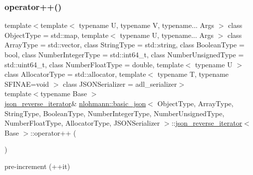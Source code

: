 \subsubsection{\texorpdfstring{operator++()}{operator++()}\hspace{0.1cm}{\footnotesize\ttfamily [2/2]}}
{\footnotesize\ttfamily template$<$template$<$ typename U, typename V, typename... Args $>$ class Object\+Type = std\+::map, template$<$ typename U, typename... Args $>$ class Array\+Type = std\+::vector, class String\+Type  = std\+::string, class Boolean\+Type  = bool, class Number\+Integer\+Type  = std\+::int64\+\_\+t, class Number\+Unsigned\+Type  = std\+::uint64\+\_\+t, class Number\+Float\+Type  = double, template$<$ typename U $>$ class Allocator\+Type = std\+::allocator, template$<$ typename T, typename S\+F\+I\+N\+A\+E=void $>$ class J\+S\+O\+N\+Serializer = adl\+\_\+serializer$>$ \\
template$<$typename Base $>$ \\
\mbox{\hyperlink{classnlohmann_1_1basic__json_1_1json__reverse__iterator}{json\+\_\+reverse\+\_\+iterator}}\& \mbox{\hyperlink{classnlohmann_1_1basic__json}{nlohmann\+::basic\+\_\+json}}$<$ Object\+Type, Array\+Type, String\+Type, Boolean\+Type, Number\+Integer\+Type, Number\+Unsigned\+Type, Number\+Float\+Type, Allocator\+Type, J\+S\+O\+N\+Serializer $>$\+::\mbox{\hyperlink{classnlohmann_1_1basic__json_1_1json__reverse__iterator}{json\+\_\+reverse\+\_\+iterator}}$<$ Base $>$\+::operator++ (\begin{DoxyParamCaption}{ }\end{DoxyParamCaption})\hspace{0.3cm}{\ttfamily [inline]}}



pre-\/increment (++it) 

\mbox{\label{classnlohmann_1_1basic__json_1_1json__reverse__iterator_a3b884d9fc5de7013be144b304df9c068}} 

